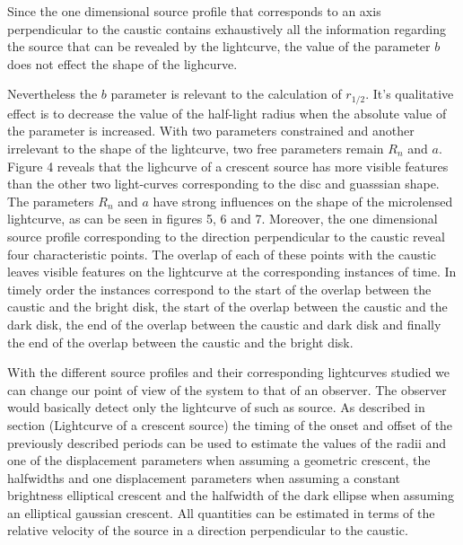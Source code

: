Since the one dimensional source profile that corresponds to an axis perpendicular to the caustic contains exhaustively all the information regarding the source that can be revealed by the lightcurve, 
the value of the parameter $b$ does not effect the shape of the lighcurve. 

Nevertheless the $b$ parameter is relevant to the calculation of $r_{1/2}$. 
It's qualitative effect is to decrease the value of the half-light radius when the absolute value of the parameter is increased.  
With two parameters constrained and another irrelevant to the shape of the lightcurve, two free parameters remain $R_n$ and $a$. 
Figure 4 reveals that the lighcurve of a crescent source has more visible features than the other two light-curves 
corresponding to the disc and guasssian shape. The parameters $R_n$ and $a$ have strong influences on the shape of 
the microlensed lightcurve, as can be seen in figures 5, 6 and 7. Moreover, the one dimensional source profile corresponding to the direction perpendicular to the caustic reveal four characteristic points. The overlap of each of these points with the caustic leaves visible features on the lightcurve at the corresponding instances of time. In timely order the instances correspond to the start of the overlap between the caustic and the bright disk, the start of the overlap between the caustic and the dark disk, the end of the overlap between the caustic and dark disk and finally the end of the overlap between the caustic and the bright disk.          

With the different source profiles and their corresponding lightcurves studied we can change our point of view of the system to that of an observer. The observer would basically detect only the lightcurve of such as source. As described in section (Lightcurve of a crescent source) the timing of the onset and offset of the previously described periods can be used to estimate the values of the radii and one of the displacement parameters when assuming a geometric crescent, the halfwidths and one displacement parameters when assuming a constant brightness elliptical crescent and the halfwidth of the dark ellipse when assuming an elliptical gaussian crescent. All quantities can be estimated in terms of the relative velocity of the source in a direction perpendicular to the caustic.\\

